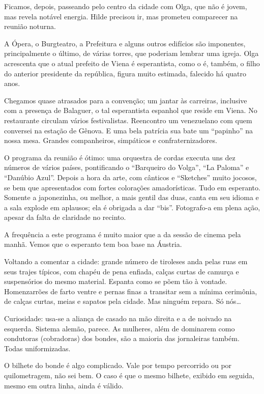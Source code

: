 Ficamos, depois, passeando pelo centro da cidade com Olga, que não é jovem, mas revela notável energia. Hilde precisou ir, mas prometeu comparecer na reunião noturna.

A Ópera, o Burgteatro, a Prefeitura e alguns outros edifícios são imponentes, principalmente o último, de várias torres, que poderiam lembrar uma igreja. Olga acrescenta que o atual prefeito de Viena é esperantista, como o é, também, o filho do anterior presidente da república, figura muito estimada, falecido há quatro anos.

Chegamos quase atrasados para a convenção; um jantar às carreiras, inclusive com a presença de Balaguer, o tal esperantista espanhol que reside em Viena. No restaurante circulam vários festivalistas. Reencontro um venezuelano com quem conversei na estação de Gênova. E uma bela patrícia sua bate um ``papinho'' na nossa mesa. Grandes companheiros, simpáticos e confraternizadores.

O programa da reunião é ótimo: uma orquestra de cordas executa uns dez números de vários países, pontificando o ``Barqueiro do Volga'', ``La Paloma'' e ``Danúbio Azul''. Depois a hora da arte, com cânticos e ``Sketches'' muito jocosos, se bem que apresentados com fortes colorações amadorísticas. Tudo em esperanto. Somente a japonezinha, ou melhor, a mais gentil das duas, canta em seu idioma e a sala explode em aplausos; ela é obrigada a dar ``bis''. Fotografo-a em plena ação, apesar da falta de claridade no recinto.

A frequência a este programa é muito maior que a da sessão de cinema pela manhã. Vemos que o esperanto tem boa base na Áustria.

Voltando a comentar a cidade: grande número de tiroleses anda pelas ruas em seus trajes típicos, com chapéu de pena enfiada, calças curtas de camurça e suspensórios do mesmo material. Espanta como se põem tão à vontade. Homenzarrões de farto ventre e pernas finas a transitar sem a mínima cerimônia, de calças curtas, meias e sapatos pela cidade. Mas ninguém repara. Só nós\ldots

Curiosidade: usa-se a aliança de casado na mão direita e a de noivado na esquerda. Sistema alemão, parece. As mulheres, além de dominarem como condutoras (cobradoras) dos bondes, são a maioria das jornaleiras também. Todas uniformizadas.

O bilhete do bonde é algo complicado. Vale por tempo percorrido ou por quilometragem, não sei bem. O caso é que o mesmo bilhete, exibido em seguida, mesmo em outra linha, ainda é válido.

